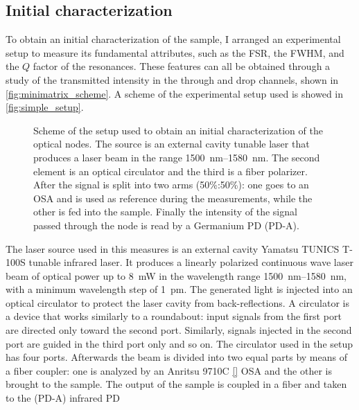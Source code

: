 \subsection{Initial characterization}
\label{ssec:initial_characterization}
To obtain an initial characterization of the sample, I arranged an experimental setup to measure its fundamental attributes, such as the \acf{FSR}, the \acf{FWHM}, and the $Q$ factor of the resonances.
These features can all be obtained through a study of the transmitted intensity in the through and drop channels, shown in \autoref{fig:minimatrix_scheme}.
A scheme of the experimental setup used is showed in \autoref{fig:simple_setup}.

\begin{figure}
	\centering
	
	\caption{Scheme of the setup used to obtain an initial characterization of the optical nodes.
		The source is an external cavity tunable laser that produces a laser beam in the range \SIrange{1500}{1580}{\nm}.
		The second element is an optical circulator and the third is a fiber polarizer.
		After the signal is split into two arms (50\%:50\%): one goes to an \acs{OSA} and is used as reference during the measurements, while the other is fed into the sample.
		Finally the intensity of the signal passed through the node is read by a Germanium \acs{PD} (PD-A).
		}
	\label{fig:simple_setup}
\end{figure}

The laser source used in this measures is an external cavity Yamatsu TUNICS T-100S tunable infrared laser.
It produces a linearly polarized continuous wave laser beam of optical power up to \SI{8}{\mW} in the wavelength range \SIrange{1500}{1580}{\nm}, with a minimum wavelength step of \SI{1}{\pm}.
The generated light is injected into an optical circulator to protect the laser cavity from back-reflections.
A circulator is a device that works similarly to a roundabout: input signals from the first port are directed only toward the second port. Similarly, signals injected in the second port are guided in the third port only and so on.
The circulator used in the setup has four ports.
Afterwards the beam is divided into two equal parts by means of a fiber coupler: one is analyzed by an Anritsu 9710C \ref{} \acf{OSA} and the other is brought to the sample.
The output of the sample is coupled in a fiber and taken to the (PD-A) infrared \ac{PD}

